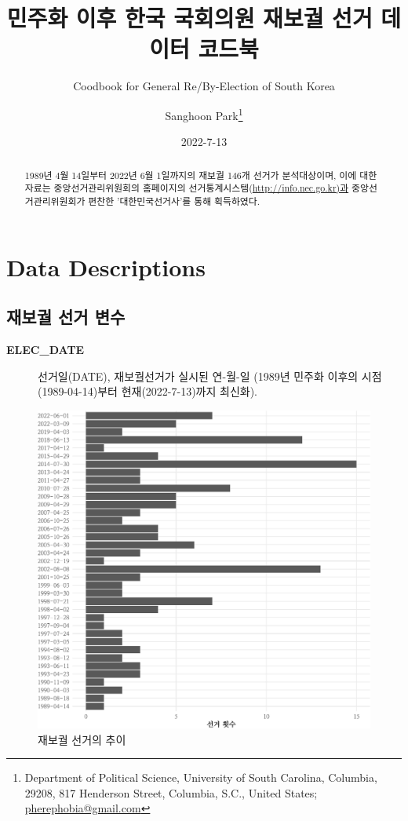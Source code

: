 \documentclass[
  11pt,
  letter]{article}
\title{\Large \bf 민주화 이후 한국 국회의원 재보궐 선거 데이터 코드북}
\subtitle{\large Coodbook for General Re/By-Election of South Korea}
\author{Sanghoon Park\footnote{Department of Political Science,
  University of South Carolina, Columbia, 29208, 817 Henderson Street,
  Columbia, S.C., United States; \url{pherephobia@gmail.com}}}
\date{2022-7-13}
\begin{document}
\maketitle
\begin{abstract}
\noindent 1989년 4월 14일부터 2022년 6월 1일까지의 재보궐 146개 선거가
분석대상이며, 이에 대한 자료는 중앙선거관리위원회의 홈페이지의
선거통계시스템(\url{http://info.nec.go.kr)과} 중앙선거관리위원회가
편찬한 '대한민국선거사'를 통해 획득하였다.
\end{abstract}

{
\setcounter{tocdepth}{3}
\tableofcontents
}
\clearpage
\newpage

\hypertarget{data-descriptions}{%
\section{Data Descriptions}\label{data-descriptions}}

\hypertarget{uxc7acuxbcf4uxad90-uxc120uxac70-uxbcc0uxc218}{%
\subsection{재보궐 선거
변수}\label{uxc7acuxbcf4uxad90-uxc120uxac70-uxbcc0uxc218}}

\begin{description}
\item[\textbf{ELEC\_DATE}]
선거일(DATE), 재보궐선거가 실시된 연-월-일 (1989년 민주화 이후의
시점(1989-04-14)부터 현재(2022-7-13)까지 최신화).
\end{description}

\begin{figure}
\centering
\includegraphics{Codebook_national_files/figure-latex/unnamed-chunk-1-1.pdf}
\caption{재보궐 선거의 추이}
\end{figure}
\end{document}
